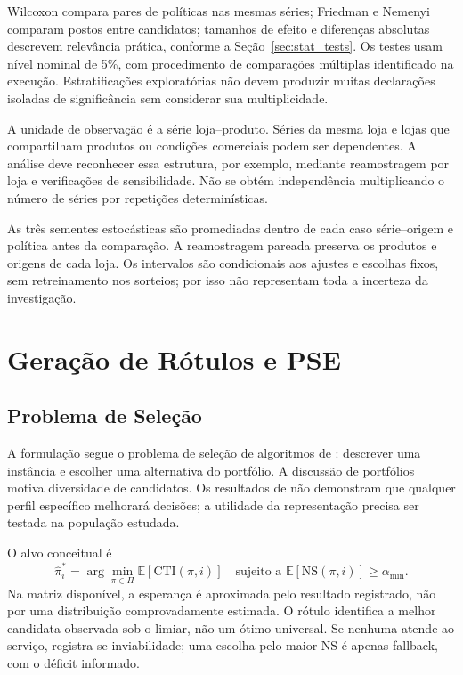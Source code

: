 Wilcoxon compara pares de políticas nas mesmas séries; Friedman e Nemenyi comparam postos entre candidatos; tamanhos de efeito e diferenças absolutas descrevem relevância prática, conforme a Seção~\ref{sec:stat_tests}. Os testes usam nível nominal de 5\%, com procedimento de comparações múltiplas identificado na execução. Estratificações exploratórias não devem produzir muitas declarações isoladas de significância sem considerar sua multiplicidade.

A unidade de observação é a série loja--produto. Séries da mesma loja e lojas que compartilham produtos ou condições comerciais podem ser dependentes. A análise deve reconhecer essa estrutura, por exemplo, mediante reamostragem por loja e verificações de sensibilidade. Não se obtém independência multiplicando o número de séries por repetições determinísticas.

As três sementes estocásticas são promediadas dentro de cada caso série--origem e política antes da comparação. A reamostragem pareada preserva os produtos e origens de cada loja. Os intervalos são condicionais aos ajustes e escolhas fixos, sem retreinamento nos sorteios; por isso não representam toda a incerteza da investigação.

\section{Geração de Rótulos e PSE}
\label{sec:selecao_contextual}
\subsection{Problema de Seleção}

A formulação segue o problema de seleção de algoritmos de \citet{Rice1976AlgorithmSelection}: descrever uma instância e escolher uma alternativa do portfólio. A discussão de portfólios~\citep{Huberman1997AlgorithmPortfolios} motiva diversidade de candidatos. Os resultados de \citet{Wolpert1997NoFreeLunch} não demonstram que qualquer perfil específico melhorará decisões; a utilidade da representação precisa ser testada na população estudada.

O alvo conceitual é
\begin{equation}
\hat\pi_i^*=\arg\min_{\pi\in\Pi}\mathbb E[\mathrm{CTI}(\pi,i)]
\quad\text{sujeito a }\mathbb E[\mathrm{NS}(\pi,i)]\geq\alpha_{\min}.
\label{eq:policy_selector}
\end{equation}
Na matriz disponível, a esperança é aproximada pelo resultado registrado, não por uma distribuição comprovadamente estimada. O rótulo identifica a melhor candidata observada sob o limiar, não um ótimo universal. Se nenhuma atende ao serviço, registra-se inviabilidade; uma escolha pelo maior NS é apenas fallback, com o déficit informado.


